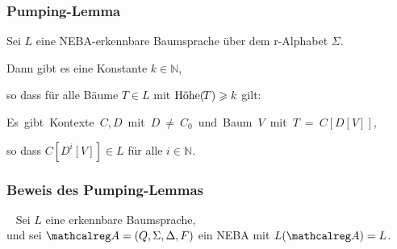     \begin{frame}
      \frametitle{Pumping-Lemma}

      \begin{Satz}
        Sei $L$ eine NEBA-erkennbare Baumsprache über dem r-Alphabet $\Sigma$.
        \par\medskip
        Dann gibt es eine Konstante $k \in \mathbb{N}$,
        \par
        so dass für alle Bäume $T \in L$ mit $\textup{Höhe}(\!\!\:T) \geqslant k$ gilt:
        \par\smallskip
        \mbox{Es gibt Kontexte $C,D$ mit $D\!\!\:\neq\!\!\:C_0$ und Baum $V$ mit $T\!\!\:=\!\!\:C[D[V]]$,\hspace*{-10mm}}
        \par
        so dass $C[D^i[V]] \in L$ für alle $i \in \mathbb{N}$.
        \label{thm:pumping_lemma}%
      \end{Satz}


    \end{frame}

    \begin{frame}
      \frametitle{Beweis des Pumping-Lemmas}
      
      ~
      Sei $L$ eine erkennbare Baumsprache, \\
      und sei $\Amc = (Q,\Sigma,\Delta,F)$ ein NEBA mit $L(\Amc) = L$.
      
      \par\bigskip
      
      \par\bigskip

      \par\bigskip
      
      \par\bigskip

    \end{frame}
      
